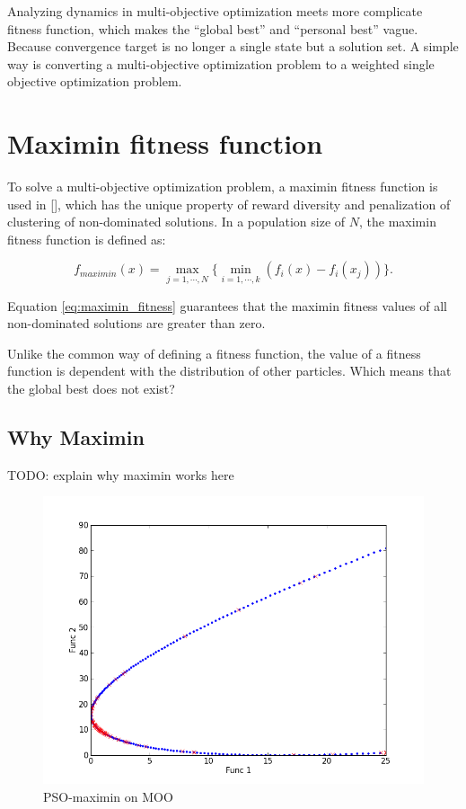 \documentclass[12pt]{article}
\begin{document}
Analyzing dynamics in multi-objective optimization meets more complicate fitness function, which makes the ``global best'' and ``personal best'' vague. Because convergence target is no longer a single state but a solution set. A simple way is converting a multi-objective optimization problem to a weighted single objective optimization problem. 


\section{Maximin fitness function}

To solve a multi-objective optimization problem, a maximin fitness function is used in [\cite{li2004better}], which has the unique property of reward diversity and penalization of clustering of non-dominated solutions. In a population size of $ N $, the maximin fitness function is defined as:

\begin{equation}
\label{eq:maximin_fitness}
f_{maximin}(x) = \max_{j=1, \cdots, N} \{ \min_{i=1, \cdots , k}  ( f_{i}(x) - f_{i}(x_{j}) )  \}.
\end{equation}

Equation \eqref{eq:maximin_fitness} guarantees that the maximin fitness values of all non-dominated solutions are greater than zero.

Unlike the common way of defining a fitness function, the value of a fitness function is dependent with the distribution of other particles. Which means that the global best does not exist?

\subsection{Why Maximin}

TODO: explain why maximin works here

\begin{figure}
\centering
\includegraphics[width=0.7\linewidth]{./C1}
\caption{PSO-maximin on MOO}
\label{fig:C1}
\end{figure}
\end{document}
